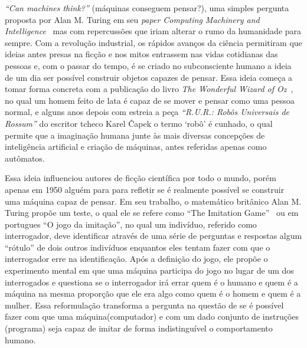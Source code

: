 

\label{cap:introducao}

\enlargethispage{.5\baselineskip}

\emph{“Can machines think?”} (máquinas conseguem pensar?), uma simples pergunta proposta por Alan M. Turing em seu \emph{paper Computing Machinery and Intelligence}~\citep{turing1950computing} mas com repercussões que iriam alterar o rumo da humanidade para sempre. Com a revolução industrial, os rápidos avanços da ciência permitiram que ideias antes presas na ficção e nos mitos entrassem nas vidas cotidianas das pessoas e, com o passar do tempo, é se criado no subconsciente humano a ideia de um dia ser possível construir objetos capazes de pensar. Essa ideia começa a tomar forma concreta com a publicação do livro \emph{The Wonderful Wizard of Oz}~\citep{Baum_Denslow_1996}, no qual um homem feito de lata é capaz de se mover e pensar como uma pessoa normal, e alguns anos depois com estreia a peça \emph{“R.U.R.: Robôs Universais de Rossum”} do escritor tcheco Karel Čapek o termo ‘robô’ é cunhado, o qual permite que a imaginação humana junte às mais diversas concepções de inteligência artificial e criação de máquinas, antes referidas apenas como autômatos.

Essa ideia influenciou autores de ficção científica por todo o mundo, porém apenas em 1950 alguém para para refletir se é realmente possível se construir uma máquina capaz de pensar. Em seu trabalho, o matemático britânico Alan M. Turing propõe um teste, o qual ele se refere como “The Imitation Game”~\citep{turing1950computing} ou em portugues “O jogo da imitação”, no qual um indivíduo, referido como interrogador, deve identificar através de uma série de perguntas e respostas algum “rótulo” de dois outros indivíduos enquantos eles tentam fazer com que o interrogador erre na identificação. Após a definição do jogo, ele propõe o experimento mental em que uma máquina participa do jogo no lugar de um dos interrogados e questiona se o interrogador irá errar quem é o humano e quem é a máquina na mesma proporção que ele era algo como quem é o homem e quem é a mulher. Essa reformulação transforma a pergunta na questão de se é possível fazer com que uma máquina(computador) e com um dado conjunto de instruções (programa) seja capaz de imitar de forma indistinguível o comportamento humano.

